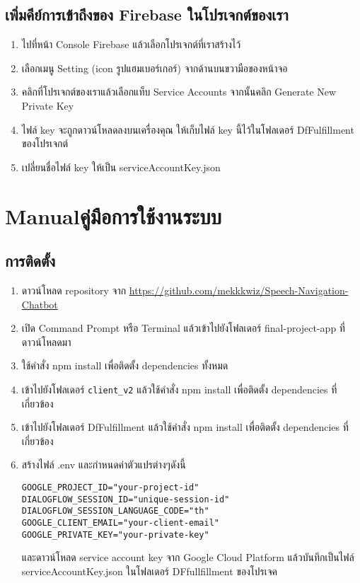 \section{เพิ่มคีย์การเข้าถึงของ Firebase ในโปรเจกต์ของเรา}
\begin{enumerate}
\item ไปที่หน้า Console Firebase แล้วเลือกโปรเจกต์ที่เราสร้างไว้
\item เลือกเมนู Setting (icon รูปแฮมเบอร์เกอร์) จากด้านบนขวามือของหน้าจอ
\item คลิกที่โปรเจกต์ของเราแล้วเลือกแท็บ Service Accounts จากนั้นคลิก Generate New Private Key
\item ไฟล์ key จะถูกดาวน์โหลดลงบนเครื่องคุณ ให้เก็บไฟล์ key นี้ไว้ในโฟลเดอร์ DfFulfillment ของโปรเจกต์
\item เปลี่ยนชื่อไฟล์ key ให้เป็น serviceAccountKey.json
\end{enumerate}

\chapter{\ifenglish Manual\else คู่มือการใช้งานระบบ\fi}


\section{การติดตั้ง}
\begin{enumerate}
\item ดาวน์โหลด repository จาก \url{https://github.com/mekkkwiz/Speech-Navigation-Chatbot}
\item เปิด Command Prompt หรือ Terminal แล้วเข้าไปยังโฟลเดอร์ final-project-app ที่ดาวน์โหลดมา
\item ใช้คำสั่ง npm install เพื่อติดตั้ง dependencies ทั้งหมด
\item เข้าไปยังโฟลเดอร์ \verb+client_v2+ แล้วใช้คำสั่ง npm install เพื่อติดตั้ง dependencies ที่เกี่ยวข้อง
\item เข้าไปยังโฟลเดอร์ DfFulfillment แล้วใช้คำสั่ง npm install เพื่อติดตั้ง dependencies ที่เกี่ยวข้อง
\item สร้างไฟล์ .env และกำหนดค่าตัวแปรต่างๆดังนี้
\begin{verbatim}
GOOGLE_PROJECT_ID="your-project-id"
DIALOGFLOW_SESSION_ID="unique-session-id"
DIALOGFLOW_SESSION_LANGUAGE_CODE="th"
GOOGLE_CLIENT_EMAIL="your-client-email"
GOOGLE_PRIVATE_KEY="your-private-key"
\end{verbatim}
และดาวน์โหลด service account key จาก Google Cloud Platform แล้วบันทึกเป็นไฟล์
serviceAccountKey.json ในโฟลเดอร์ DFfullfillment ของโปรเจค
\end{enumerate}
